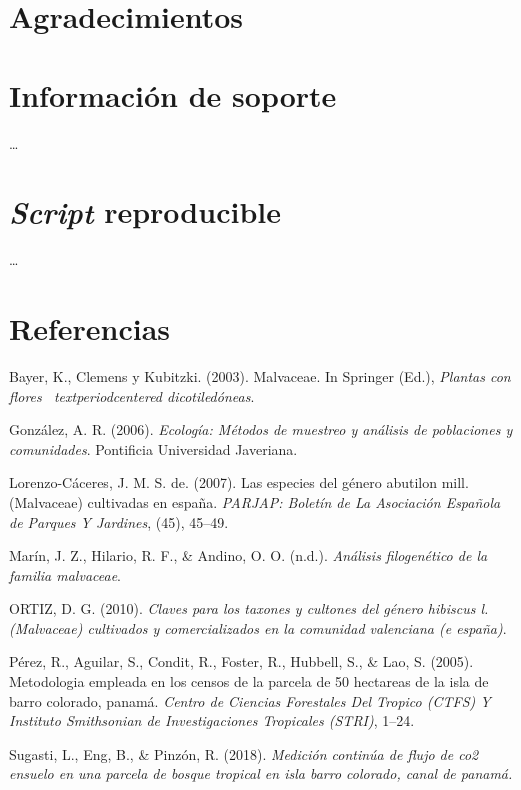 \documentclass[11pt,]{article}
\begin{document}
\section{Agradecimientos}\label{agradecimientos}

\section{Información de soporte}\label{informaciuxf3n-de-soporte}

\ldots

\section{\texorpdfstring{\emph{Script}
reproducible}{Script reproducible}}\label{script-reproducible}

\ldots

\section*{Referencias}\label{referencias}

\hypertarget{refs}{}
\hypertarget{ref-bayer2003malvaceae}{}
Bayer, K., Clemens y Kubitzki. (2003). Malvaceae. In Springer (Ed.),
\emph{Plantas con flores ~textperiodcentered dicotiledóneas}.

\hypertarget{ref-gonzalez2006ecologia}{}
González, A. R. (2006). \emph{Ecología: Métodos de muestreo y análisis
de poblaciones y comunidades}. Pontificia Universidad Javeriana.

\hypertarget{ref-de2007especies}{}
Lorenzo-Cáceres, J. M. S. de. (2007). Las especies del género abutilon
mill.(Malvaceae) cultivadas en españa. \emph{PARJAP: Boletín de La
Asociación Española de Parques Y Jardines}, (45), 45--49.

\hypertarget{ref-marinanalisis}{}
Marín, J. Z., Hilario, R. F., \& Andino, O. O. (n.d.). \emph{Análisis
filogenético de la familia malvaceae}.

\hypertarget{ref-ortizclaves}{}
ORTIZ, D. G. (2010). \emph{Claves para los taxones y cultones del género
hibiscus l.(Malvaceae) cultivados y comercializados en la comunidad
valenciana (e españa)}.

\hypertarget{ref-perez2005metodologia}{}
Pérez, R., Aguilar, S., Condit, R., Foster, R., Hubbell, S., \& Lao, S.
(2005). Metodologia empleada en los censos de la parcela de 50 hectareas
de la isla de barro colorado, panamá. \emph{Centro de Ciencias
Forestales Del Tropico (CTFS) Y Instituto Smithsonian de Investigaciones
Tropicales (STRI)}, 1--24.

\hypertarget{ref-sugastimedicion}{}
Sugasti, L., Eng, B., \& Pinzón, R. (2018). \emph{Medición continúa de
flujo de co2 ensuelo en una parcela de bosque tropical en isla barro
colorado, canal de panamá.}




\newpage
\singlespacing 
\end{document}
